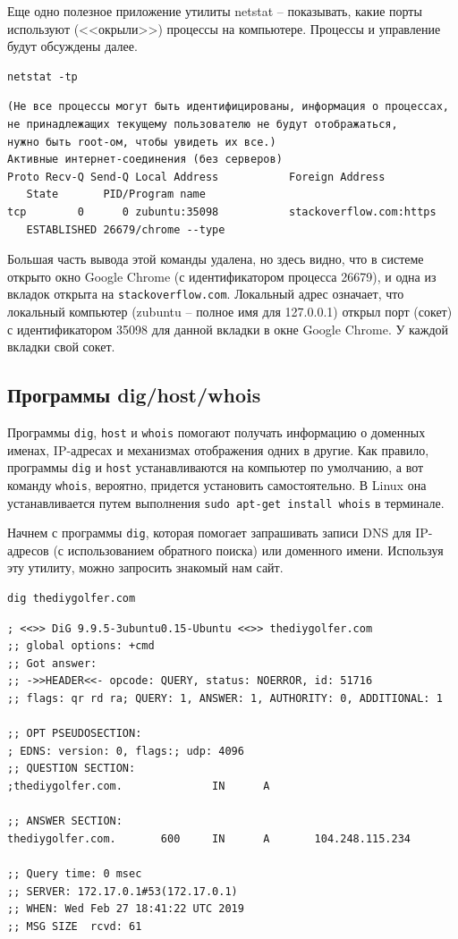 \documentclass[a4paper,12pt,final,openany]{extbook}
\begin{document}
Еще одно полезное приложение утилиты netstat -- показывать, какие порты
используют (<<окрыли>>) процессы на компьютере. Процессы и управление будут обсуждены далее.
\begin{verbatim}
netstat -tp
\end{verbatim}

\begin{verbatim}
(Не все процессы могут быть идентифицированы, информация о процессах,
не принадлежащих текущему пользователю не будут отображаться,
нужно быть root-ом, чтобы увидеть их все.)
Активные интернет-соединения (без серверов)
Proto Recv-Q Send-Q Local Address           Foreign Address
   State       PID/Program name
tcp        0      0 zubuntu:35098           stackoverflow.com:https
   ESTABLISHED 26679/chrome --type
\end{verbatim}
Большая часть вывода этой команды удалена, но здесь видно, что в системе
открыто окно Google Chrome (с идентификатором процесса 26679), и одна из
вкладок открыта на \texttt{stackoverflow.com}. Локальный адрес означает, что
локальный компьютер (zubuntu -- полное имя для 127.0.0.1) открыл порт
(сокет) с идентификатором 35098 для данной вкладки в окне Google Chrome.
У каждой вкладки свой сокет.

\hypertarget{dig-host-whois}{%
\subsection{\texorpdfstring{\protect\hyperlink{dig-host-whois}{}Программы
dig/host/whois}{Программы dig/host/whois}}\label{dig-host-whois}}

Программы \texttt{dig}, \texttt{host} и \texttt{whois} помогают получать
информацию о доменных именах, IP-адресах и механизмах отображения одних
в другие. Как правило, программы \texttt{dig} и \texttt{host}
устанавливаются на компьютер по умолчанию, а вот команду \texttt{whois},
вероятно, придется установить самостоятельно. В Linux она
устанавливается путем выполнения \texttt{sudo\ apt-get\ install\ whois}
в терминале.

Начнем с программы \texttt{dig}, которая помогает запрашивать записи DNS
для IP-адресов (с использованием обратного поиска) или доменного имени.
Используя эту утилиту, можно запросить знакомый нам сайт.

\begin{verbatim}
dig thediygolfer.com
\end{verbatim}

\begin{verbatim}
; <<>> DiG 9.9.5-3ubuntu0.15-Ubuntu <<>> thediygolfer.com
;; global options: +cmd
;; Got answer:
;; ->>HEADER<<- opcode: QUERY, status: NOERROR, id: 51716
;; flags: qr rd ra; QUERY: 1, ANSWER: 1, AUTHORITY: 0, ADDITIONAL: 1

;; OPT PSEUDOSECTION:
; EDNS: version: 0, flags:; udp: 4096
;; QUESTION SECTION:
;thediygolfer.com.              IN      A

;; ANSWER SECTION:
thediygolfer.com.       600     IN      A       104.248.115.234

;; Query time: 0 msec
;; SERVER: 172.17.0.1#53(172.17.0.1)
;; WHEN: Wed Feb 27 18:41:22 UTC 2019
;; MSG SIZE  rcvd: 61
\end{verbatim}
\end{document}
